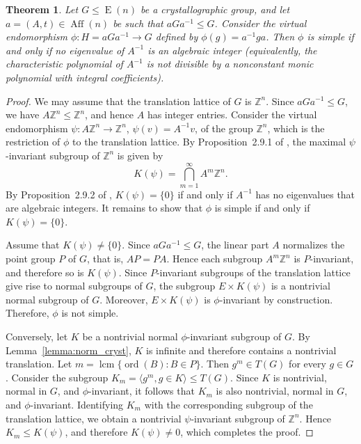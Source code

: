 \documentclass[draft]{adm-paper}
\newtheorem{theorem}{Theorem}
\theoremstyle{definition}
\begin{document}
\begin{theorem}
Let $G\le\operatorname{E}(n)$ be a crystallographic group, and let $a = (A,t)\in \operatorname{Aff}(n)$ be such that
$aGa^{-1}\le G$. Consider the virtual endomorphism $\phi: H=aGa^{-1}\rightarrow G$ defined by $\phi(g) = a^{-1}ga$.
Then $\phi$ is simple if and only if no eigenvalue of $A^{-1}$ is an algebraic integer (equivalently, the
characteristic polynomial of $A^{-1}$ is not divisible by a nonconstant monic polynomial with integral coefficients).
\end{theorem}
\begin{proof}
We may assume that the translation lattice of $G$ is $\mathbb{Z}^n$.
Since $aGa^{-1}\le G$, we have $A\mathbb{Z}^n\leq\mathbb{Z}^n$, and hence $A$ has integer entries. Consider the
virtual endomorphism $\psi:A\mathbb{Z}^n\rightarrow\mathbb{Z}^n$, $\psi(v)=A^{-1}v$, of the group $\mathbb{Z}^n$,
which is the restriction of $\phi$ to the translation lattice. By Proposition~2.9.1 of
\cite{Nekrashevych:Self-similar}, the maximal $\psi$-invariant subgroup of $\mathbb{Z}^n$ is given by
\[
K(\psi) = \bigcap_{m=1}^{\infty} A^m \mathbb{Z}^n.
\]
By Proposition~2.9.2 of \cite{Nekrashevych:Self-similar}, $K(\psi)=\{0\}$ if and only if
$A^{-1}$ has no eigenvalues that are algebraic integers. It remains to show that $\phi$ is simple if and only if $K(\psi)=\{0\}$.

Assume that $K(\psi)\neq\{0\}$. Since $aGa^{-1}\leq G$, the linear part $A$ normalizes the point group $P$ of $G$,
that is, $AP=PA$. Hence each subgroup $A^m\mathbb{Z}^n$ is $P$-invariant, and therefore so is $K(\psi)$. Since
$P$-invariant subgroups of the translation lattice give rise to normal subgroups of $G$, the subgroup $E\times
K(\psi)$ is a nontrivial  normal subgroup of $G$. Moreover, $E\times K(\psi)$ is $\phi$-invariant by construction.
Therefore, $\phi$ is not simple.

Conversely, let $K$ be a nontrivial normal $\phi$-invariant subgroup of $G$. By Lemma~\ref{lemma:norm_cryst}, $K$ is
infinite and therefore contains a nontrivial translation. Let $m=\operatorname{lcm}\{\operatorname{ord}(B) : B\in
P\}$. Then $g^{m}\in T(G)$ for every $g\in G$. Consider the subgroup $K_m=\langle g^{m}, g\in K\rangle\le T(G)$. Since
$K$ is nontrivial, normal in $G$, and $\phi$-invariant, it follows that $K_m$ is also nontrivial, normal in $G$, and
$\phi$-invariant. Identifying $K_m$ with the corresponding subgroup of the translation lattice, we obtain a nontrivial
$\psi$-invariant subgroup of $\mathbb{Z}^n$. Hence $K_m\le K(\psi)$, and therefore $K(\psi)\neq{0}$, which completes
the proof.
\end{proof}
\end{document}
